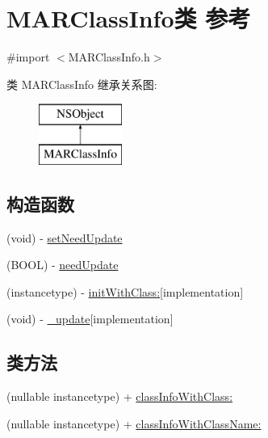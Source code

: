 \hypertarget{interface_m_a_r_class_info}{}\section{M\+A\+R\+Class\+Info类 参考}
\label{interface_m_a_r_class_info}


{\ttfamily \#import $<$M\+A\+R\+Class\+Info.\+h$>$}

类 M\+A\+R\+Class\+Info 继承关系图\+:\begin{figure}[H]
\begin{center}
\leavevmode
\includegraphics[height=2.000000cm]{interface_m_a_r_class_info}
\end{center}
\end{figure}
\subsection*{构造函数}
\begin{DoxyCompactItemize}
\item 
(void) -\/ \hyperlink{interface_m_a_r_class_info_aa2405636e5ef7a11068f377b5a9e5b12}{set\+Need\+Update}
\item 
(B\+O\+OL) -\/ \hyperlink{interface_m_a_r_class_info_ae70c6b93e18b3bb283bd5f5bcb25dae2}{need\+Update}
\item 
(instancetype) -\/ \hyperlink{interface_m_a_r_class_info_a1a48eba29b3dbc9fde95f62721e0b26c}{init\+With\+Class\+:}{\ttfamily  \mbox{[}implementation\mbox{]}}
\item 
(void) -\/ \hyperlink{interface_m_a_r_class_info_afaa3830de4c083c8535e37938dc3f025}{\+\_\+update}{\ttfamily  \mbox{[}implementation\mbox{]}}
\end{DoxyCompactItemize}
\subsection*{类方法}
\begin{DoxyCompactItemize}
\item 
(nullable instancetype) + \hyperlink{interface_m_a_r_class_info_acff0082c25a0ba994f9f9dc7b9642523}{class\+Info\+With\+Class\+:}
\item 
(nullable instancetype) + \hyperlink{interface_m_a_r_class_info_af02aef4558c3d2d1060850a8564c2710}{class\+Info\+With\+Class\+Name\+:}
\end{DoxyCompactItemize}
